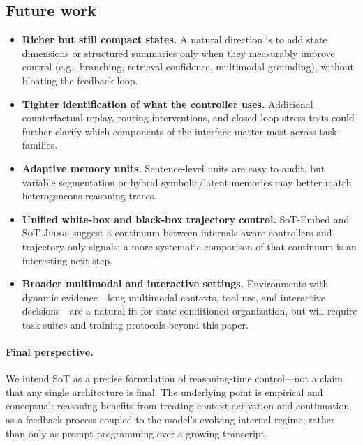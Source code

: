 \subsection{Future work}
\begin{itemize}[leftmargin=1.6em]
    \item \textbf{Richer but still compact states.}
    A natural direction is to add state dimensions or structured summaries only when they measurably improve control (e.g., branching, retrieval confidence, multimodal grounding), without bloating the feedback loop.

    \item \textbf{Tighter identification of what the controller uses.}
    Additional counterfactual replay, routing interventions, and closed-loop stress tests could further clarify which components of the interface matter most across task families.

    \item \textbf{Adaptive memory units.}
    Sentence-level units are easy to audit, but variable segmentation or hybrid symbolic/latent memories may better match heterogeneous reasoning traces.

    \item \textbf{Unified white-box and black-box trajectory control.}
    SoT-Embed and \textsc{SoT-Judge} suggest a continuum between internals-aware controllers and trajectory-only signals; a more systematic comparison of that continuum is an interesting next step.

    \item \textbf{Broader multimodal and interactive settings.}
    Environments with dynamic evidence---long multimodal contexts, tool use, and interactive decisions---are a natural fit for state-conditioned organization, but will require task suites and training protocols beyond this paper.
\end{itemize}

\paragraph{Final perspective.}
We intend SoT as a precise formulation of reasoning-time control---not a claim that any single architecture is final.
The underlying point is empirical and conceptual: reasoning benefits from treating context activation and continuation as a feedback process coupled to the model's evolving internal regime, rather than only as prompt programming over a growing transcript.
